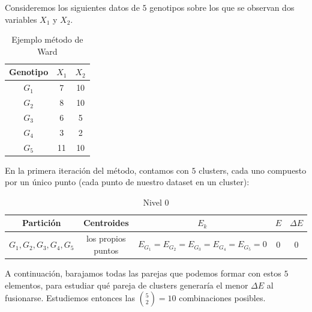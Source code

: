 \begin{ejemplo}

    Consideremos los siguientes datos de $5$ genotipos sobre los que se observan dos variables $X_{1}$ y $X_{2}$.

    \begin{table}[h]
        \centering
        \begin{tabular}{|c|c|c|}
            \hline
            \textbf{Genotipo} & \textbf{$X_{1}$} & \textbf{$X_{2}$} \\
            \hline
            $G_{1}$ & 7 & 10 \\
            \hline
            $G_{2}$ & 8 & 10 \\
            \hline
            $G_{3}$ & 6 & 5 \\
            \hline
            $G_{4}$ & 3 & 2 \\
            \hline
            $G_{5}$ & 11 & 10 \\
            \hline
            
        \end{tabular}
        \caption{Ejemplo método de Ward}

    \end{table}
    
    En la primera iteración del método, contamos con $5$ clusters, cada uno compuesto por un único punto (cada punto de nuestro dataset 
    en un cluster):

    \begin{table}[h]
        \centering
        \begin{tabular}{|c|c|c|c|c|}
            \hline
            \textbf{Partición} & \textbf{Centroides} & \textbf{$E_{k}$} & \textbf{$E$} & \textbf{$\Delta E$} \\
            \hline
            $G_{1},G_{2},G_{3},G_{4},G_{5}$ & los propios puntos & $E_{G_{1}} = E_{G_{2}}=E_{G_{3}}=E_{G_{4}}=E_{G_{5}}=0$ & $0$ & $0$ \\
            \hline
        \end{tabular}
        \caption{Nivel 0} 

    \end{table}

    A continuación, barajamos todas las parejas que podemos formar con estos $5$ elementos, para estudiar qué pareja de clusters generaría el menor
    $\Delta E$ al fusionarse. Estudiemos entonces las $\binom{5}{2} = 10$ combinaciones posibles.


\end{ejemplo}
